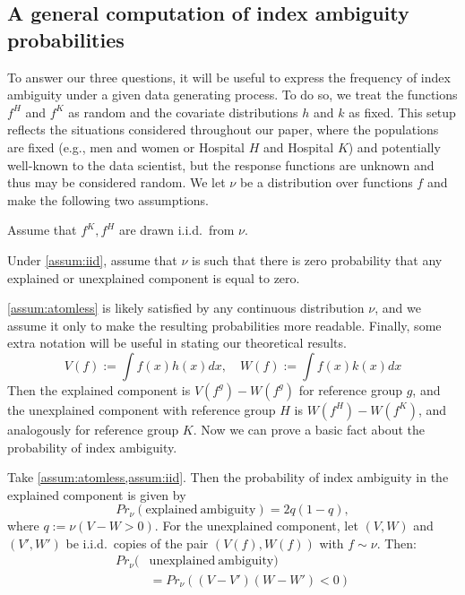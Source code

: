 \subsection{A general computation of index ambiguity probabilities}
\label{sec:general_flip_probabilities}
To answer our three questions, it will be useful to express the frequency of index ambiguity under a given data generating process.
To do so, we treat the functions $f^H$ and $f^K$ as random and the covariate distributions $h$ and $k$ as fixed.
This setup reflects the situations considered throughout our paper, where the populations are fixed (e.g., men and women or Hospital $H$ and Hospital $K$) and potentially well-known to the data scientist, but the response functions are unknown and thus may be considered random.
We let $\nu$ be a distribution over functions $f$ and make the following two assumptions.
%
\begin{assumption} \label{assum:iid}
Assume that $f^K, f^H$ are drawn i.i.d.\ from $\nu$.
\end{assumption}
\begin{assumption} \label{assum:atomless}
	Under \cref{assum:iid}, assume that $\nu$ is such that there is zero probability that any explained or unexplained component is equal to zero.
\end{assumption}
\cref{assum:atomless} is likely satisfied by any continuous distribution $\nu$, and we assume it only to make the resulting probabilities more readable.
Finally, some extra notation will be useful in stating our theoretical results.
\begin{equation}
	V(f) := \int f(x)h(x) dx, \quad W(f) := \int f(x)k(x)dx
\end{equation}
Then the explained component is $V(f^g) - W(f^g)$ for reference group $g$, and the unexplained component with reference group $H$ is $W(f^H) - W(f^K)$, and analogously for reference group $K$.
Now we can prove a basic fact about the probability of index ambiguity.
\begin{proposition} \label{prop:generic_flip_probs}
	Take \cref{assum:atomless,assum:iid}.
	Then the probability of index ambiguity in the explained component is given by
	\begin{equation}
		Pr_\nu(\mathrm{explained\ ambiguity}) = 2 q (1-q), \label{eq:explained_flip_pr}
	\end{equation}
	where $q := \nu(V-W > 0)$.
	For the unexplained component, let $(V,W)$ and $(V', W')$ be i.i.d.\ copies of the pair $(V(f), W(f))$ with $f \sim \nu$. Then:
	\begin{align}
		Pr_\nu(& \mathrm{unexplained\ ambiguity}) \nonumber \\
		& = Pr_\nu \left( (V - V')(W - W') < 0 \right) \label{eq:unexplained_flip_pr}
	\end{align}
\end{proposition}
